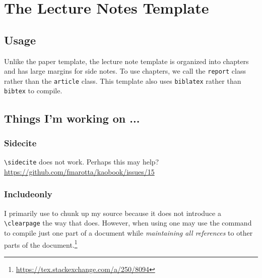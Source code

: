 \documentclass[12pt, oneside]{report}    %
\let\oldsection\section
\def\section{%
  \setcounter{sidenote}{1}%
  \oldsection
}
\begin{document}

\chapter{The Lecture Notes Template}

\section{Usage}

Unlike the paper template, the lecture note template is organized into chapters and has large margins for side notes. To use chapters, we call the \texttt{report} class rather than the \texttt{article} class. This template also uses \texttt{biblatex} rather than \texttt{bibtex} to compile.


\section{Things I'm working on ...}

\subsection{Sidecite}
\verb!\sidecite! does not work. Perhaps this may help?
\url{https://github.com/fmarotta/kaobook/issues/15}


\subsection{Includeonly}

I primarily use \verb!! to chunk up my source because it does not introduce a \verb!\clearpage! the way that \verb!! does. However, when using \verb!! one may use the \verb!! command to compile just one part of a document while \emph{maintaining all references} to other parts of the document.\footnote{\url{https://tex.stackexchange.com/a/250/8094}} 






\end{document}
